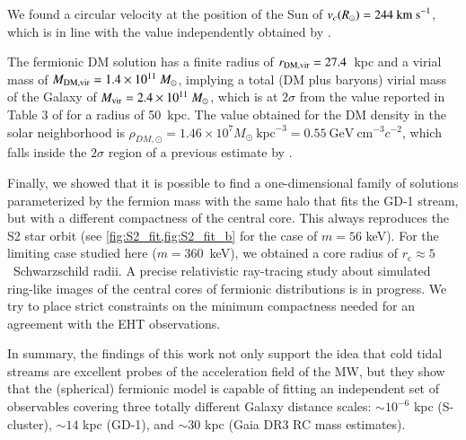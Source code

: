 \documentclass[twocolumn]{aa}
\begin{document}
We found a circular velocity at the position of the Sun of $v_c(R_\odot)= 244~\rm{km~s}^{-1}$, which is in line with the value independently obtained by \citet{2019MNRAS.486.2995M}.

The fermionic DM solution has a finite radius of $r_{\rm{DM,vir}}=27.4$~kpc and a virial mass of
$M_{\rm{DM,vir}}=1.4\times10^{11}~M_\odot$, implying a total (DM plus baryons) virial mass of the Galaxy of $M_{\rm{vir}}= 2.4\times10^{11}~M_\odot$, which is at $2\sigma$ from the value reported in Table 3 of
\citet{2014MNRAS.445.3788G} for a radius of 50~kpc. The value obtained for the DM density in the solar neighborhood is $\rho_{DM,\odot}=1.46\times10^7M_\odot~\mathrm{kpc}^{-3}=0.55~\mathrm{GeV}~\mathrm{cm}^{-3} c^{-2}$, which falls inside the $2\sigma$ region of a previous estimate by \citet{Salucci2010}.

Finally, we showed that it is possible to find a one-dimensional family of solutions parameterized by the fermion mass with the same halo that fits the GD-1 stream, but with a different compactness of the central core. This always reproduces the S2 star orbit (see \cref{fig:S2_fit,fig:S2_fit_b} for the case of $m=56$ keV). For the limiting case studied here ($m=360$~keV), we obtained a core radius of $r_\mathrm{c}\approx5$~Schwarzschild radii.
A precise relativistic ray-tracing study about simulated ring-like images of the central
cores of fermionic distributions is in progress. We try to place strict constraints on the minimum
compactness needed for an agreement with the EHT observations.


In summary, the findings of this work not only support the idea that cold tidal streams are excellent probes of the acceleration field of the MW, but they show that the (spherical) fermionic model is capable of fitting an independent set of observables covering three totally different Galaxy distance scales: $\sim 10^{-6}$ kpc (S-cluster), $\sim 14$ kpc (GD-1), and $\sim 30$ kpc (Gaia DR3 RC mass estimates).


\end{document}
